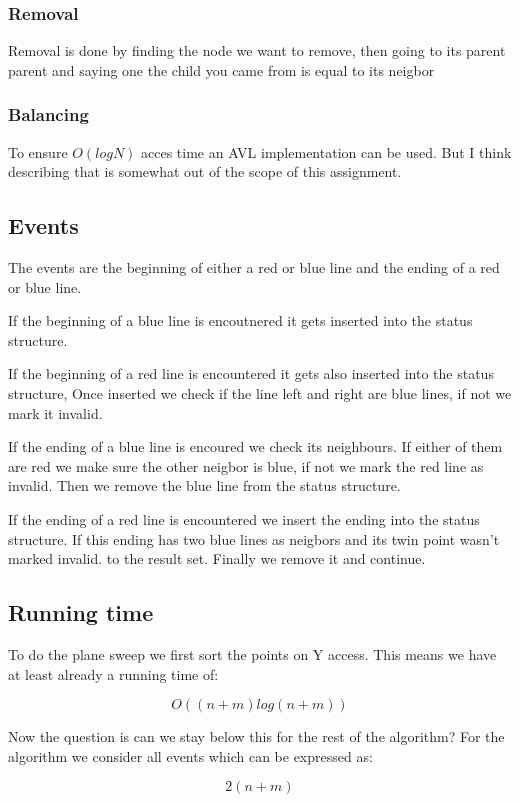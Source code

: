 \documentclass{article}
\begin{document}
\subsubsection{Removal}
Removal is done by finding the node we want to remove, then going to its
parent parent and saying one the child you came from is equal to its neigbor

\subsubsection{Balancing}
To ensure $O(log N)$ acces time an AVL implementation
can be used. But I think describing that is somewhat out of the scope
of this assignment.

\subsection{Events}
The events are the beginning of either a red or blue line and the ending of
a red or blue line.

If the beginning of a blue line is encoutnered it gets inserted into the
status structure.

If the beginning of a red line is encountered it gets also
inserted into the status structure, Once inserted we check if the line left
and right are blue lines, if not we mark it invalid.

If the ending of a blue line is encoured we check its neighbours. If either
of them are red we make sure the other neigbor is blue, if not we mark the red line as invalid.
Then we remove the blue line from the status structure.

If the ending of a red line is encountered we insert the ending into the status structure.
If this ending has two blue lines as neigbors and its twin point wasn't marked invalid.
to the result set.
Finally we remove it and continue.

\subsection{Running time}
To do the plane sweep we first sort the points on Y access. This means
we have at least already a running time of:

\[ O((n+m) log (n+m))\]

Now the question is can we stay below this for the rest of the algorithm?
For the algorithm we consider all events which can be expressed as:

\[ 2(n+m) \]
\end{document}
